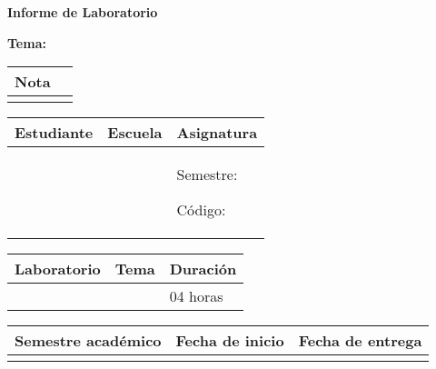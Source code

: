 
	
	\vspace*{10pt}
	
	\begin{center}	
		\fontsize{17}{17} \textbf{ Informe de Laboratorio \itemPracticeNumber}
	\end{center}
	\centerline{\textbf{\Large Tema: \itemTheme}}
	\vspace*{0.5cm}	

	\begin{flushright}
		\begin{tabular}{|M{2.5cm}|N|}
			\hline 
			\color{white} \textbf{Nota}  \\
			\hline 
			     \\[30pt]
			\hline 			
		\end{tabular}
	\end{flushright}	

	\begin{table}[H]
		\begin{tabular}{|x{4.9cm}|x{4.3cm}|x{5.1cm}|}
			\hline 
			\color{white} \textbf{Estudiante} & \color{white}\textbf{Escuela}  & \color{white}\textbf{Asignatura}   \\
			\hline 
			{\itemStudent \par \itemEmail} & \itemSchool & {\itemCourse \par Semestre: \itemSemester \par Código: \itemCourseCode}     \\
			\hline 			
		\end{tabular}
	\end{table}		
	
	\begin{table}[H]
		\begin{tabular}{|x{4.7cm}|x{4.8cm}|x{4.8cm}|}
			\hline 
			\color{white}\textbf{Laboratorio} & \color{white}\textbf{Tema}  & \color{white}\textbf{Duración}   \\
			\hline 
			\itemPracticeNumber & \itemTheme & 04 horas   \\
			\hline 
		\end{tabular}
	\end{table}
	
	\begin{table}[H]
		\begin{tabular}{|x{4.7cm}|x{4.8cm}|x{4.8cm}|}
			\hline 
			\color{white}\textbf{Semestre académico} & \color{white}\textbf{Fecha de inicio}  & \color{white}\textbf{Fecha de entrega}   \\
			\hline 
			\itemAcademic & \itemInput &  \itemOutput  \\
			\hline 
		\end{tabular}
	\end{table}


